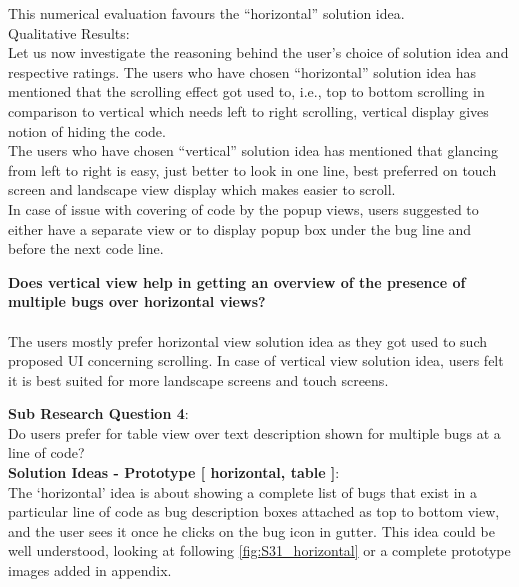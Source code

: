 This numerical evaluation favours the “horizontal” solution idea. \\

Qualitative Results: \\

Let us now investigate the reasoning behind the user’s choice of solution idea and respective ratings. The users who have chosen “horizontal” solution idea has mentioned that the scrolling effect got used to, i.e., top to bottom scrolling in comparison to vertical which needs left to right scrolling, vertical display gives notion of hiding the code. \\ 
The users who have chosen “vertical” solution idea has mentioned that glancing from left to right is easy, just better to look in one line, best preferred on touch screen and landscape view display which makes easier to scroll. \\

In case of issue with covering of code by the popup views, users suggested to either have a separate view or to display popup box under the bug line and before the next code line. \\

\begin{myboxi}{{\textbf{Does vertical view help in getting an overview of the presence of multiple bugs over horizontal views?}}}
	\\ \\ The users mostly prefer horizontal view solution idea as they got used to such proposed UI concerning scrolling. In case of vertical view solution idea, users felt it is best suited for more landscape screens and touch screens.
\end{myboxi}


\clearpage
\textbf{Sub Research Question 4}: \\

Do users prefer for table view over text description shown for multiple bugs at a line of code? \\

\textbf{Solution Ideas - Prototype [ horizontal, table ]}: \\

The ‘horizontal’ idea is about showing a complete list of bugs that exist in a particular line of code as bug description boxes attached as top to bottom view, and the user sees it once he clicks on the bug icon in gutter. This idea could be well understood, looking at following \autoref{fig:S31_horizontal} or a complete prototype images added in appendix. \\


